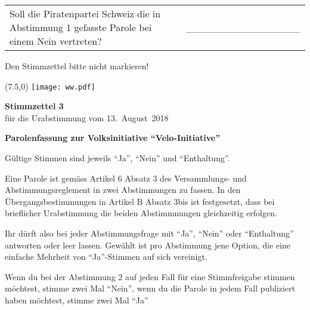 \documentclass[11pt, a4paper]{scrartcl}
\begin{document}
{\begin{minipage}[t][12.5cm][t]{17.7cm}
\vspace{0.5cm}

\begin{tabular}{ b{13.5cm} b{3cm} }
Soll die Piratenpartei Schweiz die in Abstimmung 1 gefasste Parole bei einem Nein vertreten? 
& \_\_\_\_\_\_\_\_\_\_\_\_\_\_\_\_ \\
\end{tabular}

\vspace{0.5cm}

Den Stimmzettel bitte nicht markieren!

\end{minipage}

\newpage

\begin{minipage}[t][12.5cm][t]{17.7cm}

\begin{textblock}{6}(7.5,0)
\texttt{[image: ww.pdf]}
\end{textblock}

{\LARGE\textbf{Stimmzettel 3}} \\
für die Urabstimmung vom 13.~August~2018 \\

\vspace{2cm}

\textbf{Parolenfassung zur Volksinitiative \enquote{Velo-Initiative}}

\vspace{0.2cm}
Gültige Stimmen sind jeweils \enquote{Ja}, \enquote{Nein} und \enquote{Enthaltung}.

\vspace{0.2cm}
Eine Parole ist gemäss Artikel 6 Absatz 3 des Versammlungs- und Abstimmungsreglement in zwei Abstimmungen zu fassen. In den Übergangsbestimmungen in Artikel B Absatz 3bis ist festgesetzt, dass bei brieflicher Urabstimmung die beiden Abstimmnungen gleichzeitig erfolgen.

\vspace{0.2cm}
Ihr dürft also bei jeder Abstimmungsfrage mit \enquote{Ja}, \enquote{Nein} oder \enquote{Enthaltung} antworten oder leer lassen. Gewählt ist pro Abstimmung jene Option, die eine einfache Mehrheit von \enquote{Ja}-Stimmen auf sich vereinigt. 

\vspace{0.2cm}
Wenn du bei der Abstimmung 2 auf jeden Fall für eine Stimmfreigabe stimmen möchtest, stimme zwei Mal \enquote{Nein}, wenn du die Parole in jedem Fall publiziert haben möchtest, stimme zwei Mal \enquote{Ja} %


\end{minipage}}
\end{document}
